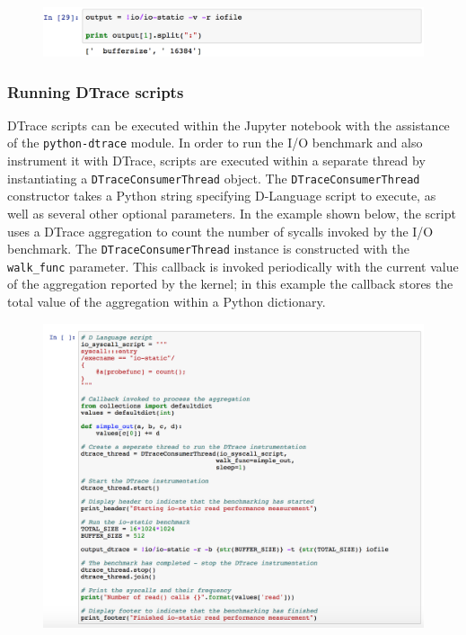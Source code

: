 \documentclass[a4paper,10pt]{article}
\newcommand{\code}[1]{\texttt{\small #1}}
\begin{document}
{\begin{figure}[H]
\includegraphics[width=\linewidth]{jupyter_running_benchmark_capture.png}
\end{figure}

\subsubsection*{Running DTrace scripts}

DTrace scripts can be executed within the Jupyter notebook with the assistance
of the \code{python-dtrace} module. In order to run the I/O benchmark and
also instrument it with DTrace, scripts are executed within a separate thread
by instantiating a \code{DTraceConsumerThread} object. The
\code{DTraceConsumerThread} constructor takes a Python string specifying
D-Language script to execute, as well as several other optional parameters. In
the example shown below, the script uses a DTrace aggregation to count the
number of sycalls invoked by the I/O benchmark. The
\code{DTraceConsumerThread} instance is constructed with the
\code{walk\_func} parameter. This callback is invoked periodically with the
current value of the aggregation reported by the kernel; in this example the
callback stores the total value of the aggregation within a Python dictionary.

\begin{figure}[H]
\includegraphics[width=\linewidth]{jupyter_python_dtrace.png}
\end{figure}

}
\end{document}

